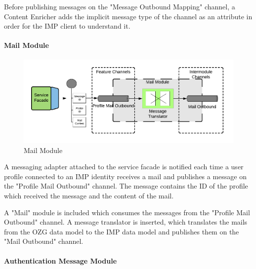 Before publishing messages on the "Message Outbound Mapping" channel, a Content Enricher adds the implicit message type of the channel as an attribute in order for the IMP client to understand it. 

\paragraph{Mail Module}

\begin{figure}[h!]
    \centering
    \includegraphics[scale=0.6]{Diagrams/Integration Architecture 1/Technological Integration/15. Mail Module.pdf}
    \caption{Mail Module}
    \label{integration1:mail_module}
\end{figure}


A messaging adapter attached to the service facade is notified each time a user profile connected to an IMP identity receives a mail and publishes a message on the "Profile Mail Outbound" channel. The message contains the ID of the profile which received the message and the content of the mail.

A "Mail" module is included which consumes the messages from the "Profile Mail Outbound" channel. A message translator is inserted, which translates the mails from the OZG data model to the IMP data model and publishes them on the "Mail Outbound" channel.

\paragraph{Authentication Message Module}

